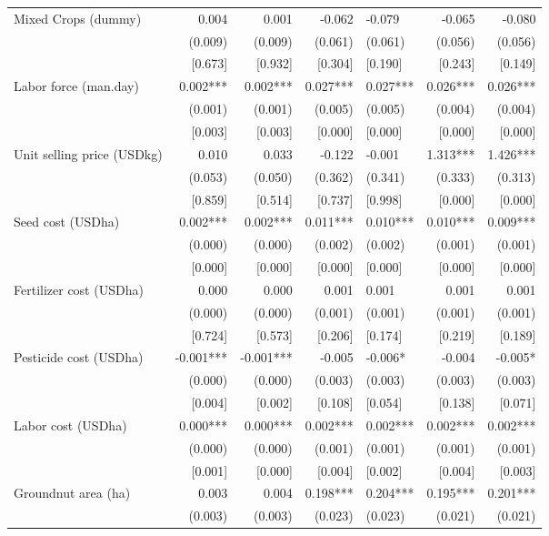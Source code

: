 \documentclass[
]{article}
\begin{document}
\begin{ThreePartTable}
\begin{longtable}[t]{lrrrlrr}
Mixed Crops (dummy) & 0.004 & 0.001 & -0.062 & -0.079 & -0.065 & -0.080\\
 & (0.009) & (0.009) & (0.061) & (0.061) & (0.056) & (0.056)\\
 & {}[0.673] & {}[0.932] & {}[0.304] & {}[0.190] & {}[0.243] & {}[0.149]\\
Labor force (man.day) & 0.002*** & 0.002*** & 0.027*** & 0.027*** & 0.026*** & 0.026***\\
 & (0.001) & (0.001) & (0.005) & (0.005) & (0.004) & (0.004)\\
 & {}[0.003] & {}[0.003] & {}[0.000] & {}[0.000] & {}[0.000] & {}[0.000]\\
Unit selling price (USD\/kg) & 0.010 & 0.033 & -0.122 & -0.001 & 1.313*** & 1.426***\\
 & (0.053) & (0.050) & (0.362) & (0.341) & (0.333) & (0.313)\\
 & {}[0.859] & {}[0.514] & {}[0.737] & {}[0.998] & {}[0.000] & {}[0.000]\\
Seed cost (USD\/ha) & 0.002*** & 0.002*** & 0.011*** & 0.010*** & 0.010*** & 0.009***\\
 & (0.000) & (0.000) & (0.002) & (0.002) & (0.001) & (0.001)\\
 & {}[0.000] & {}[0.000] & {}[0.000] & {}[0.000] & {}[0.000] & {}[0.000]\\
Fertilizer cost (USD\/ha) & 0.000 & 0.000 & 0.001 & 0.001 & 0.001 & 0.001\\
 & (0.000) & (0.000) & (0.001) & (0.001) & (0.001) & (0.001)\\
 & {}[0.724] & {}[0.573] & {}[0.206] & {}[0.174] & {}[0.219] & {}[0.189]\\
Pesticide cost (USD\/ha) & -0.001*** & -0.001*** & -0.005 & -0.006* & -0.004 & -0.005*\\
 & (0.000) & (0.000) & (0.003) & (0.003) & (0.003) & (0.003)\\
 & {}[0.004] & {}[0.002] & {}[0.108] & {}[0.054] & {}[0.138] & {}[0.071]\\
Labor cost (USD\/ha) & 0.000*** & 0.000*** & 0.002*** & 0.002*** & 0.002*** & 0.002***\\
 & (0.000) & (0.000) & (0.001) & (0.001) & (0.001) & (0.001)\\
 & {}[0.001] & {}[0.000] & {}[0.004] & {}[0.002] & {}[0.004] & {}[0.003]\\
Groundnut area (ha) & 0.003 & 0.004 & 0.198*** & 0.204*** & 0.195*** & 0.201***\\
 & (0.003) & (0.003) & (0.023) & (0.023) & (0.021) & (0.021)\\

\end{longtable}
\end{ThreePartTable}
\end{document}
